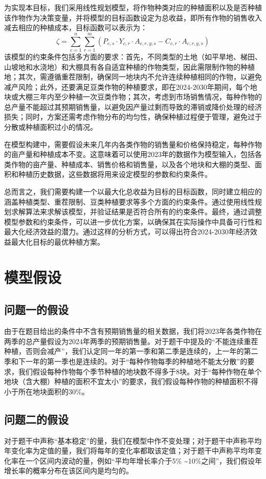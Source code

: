 \documentclass{cumcmthesis}
\begin{document}
为实现本目标，我们采用线性规划模型，将作物种类对应的种植面积以及是否种植该作物作为决策变量，并将模型的目标函数设定为总收益，即所有作物的销售收入减去相应的种植成本，目标函数可以表示为：
\begin{equation}
    \zeta = \sum_{c=1}^{n} \sum_{r=1}^{m} (P_{c,s} \cdot Y_{c,r} \cdot A_{c,r,y,s} - C_{c,r} \cdot A_{c,r,y,s})
\end{equation}
该模型的约束条件包括多方面的要求：首先，不同类型的土地（如平旱地、梯田、山坡地和水浇地）和大棚具有各自适宜种植的作物类型，因此需限制作物的种植地；其次，需遵循重茬限制，确保同一地块内不允许连续种植相同的作物，以避免减产风险；此外，还要满足豆类作物的种植要求，即在2024-2030年期间，每个地块或大棚三年内至少种植一次豆类作物；其次，考虑到市场销售情况，每种作物的总产量不能超过其预期销售量，以避免因产量过剩而导致的滞销或降价处理的经济损失；同时，方案还需考虑作物分布的均匀性，确保种植过程便于管理，避免过于分散或种植面积过小的情况。

在模型构建中，需要假设未来几年内各类作物的销售量和价格保持稳定，每种作物的亩产量和种植成本不变。这意味着可以使用2023年的数据作为模型输入，包括各类作物的亩产量、种植成本、销售价格和销售量，以及各个地块和大棚的类型、面积和种植历史数据，这些数据将用来设定模型的参数和约束条件。

总而言之，我们需要构建一个以最大化总收益为目标的目标函数，同时建立相应的涵盖种植类型、重茬限制、豆类种植要求等多个方面的约束条件。通过使用线性规划求解算法来求解该模型，并验证结果是否符合所有的约束条件。最终，通过调整模型参数和约束条件，可以进一步优化方案，以确保其在实际操作中具备可行性和最大化经济效益的潜力。通过这样的分析方式，可以得出符合2024-2030年经济效益最大化目标的最优种植方案。



\section{模型假设}
\subsection{问题一的假设}
由于在题目给出的条件中不含有预期销售量的相关数据，我们将2023年各类作物在两季的总产量假设为2024年两季的预期销售量。对于题干中提及的“不能连续重茬种植，否则会减产”，我们认定同一年的第一季和第二季是连续的，上一年的第二季和下一年的第一季也是连续的。对于“每种作物每季的种植地不能太分散”的要求，我们假设每种作物每个季节种植的地块数不得多于8块。对于“每种作物在单个地块（含大棚）种植的面积不宜太小”的要求，我们假设每种作物的种植面积不得小于所在地块面积的30\%。
\subsection{问题二的假设}
对于题干中声称“基本稳定”的量，我们在模型中作不变处理；对于题干中声称平均年变化率为定值的量，我们将每年的变化率都取该定值；对于题干中声称平均年变化率在一个区间内波动的量，例如“平均年增长率介于5\% \textasciitilde 10\%之间”，我们假设年增长率的概率分布在该区间内是均匀的。
\end{document}

